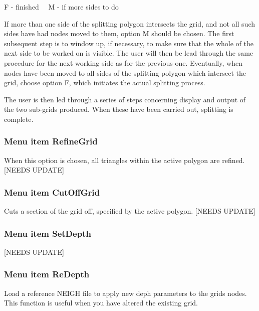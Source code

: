 \documentclass{article}
\begin{document}
F - finished \ \ M - if more sides to do

If more than one side of the splitting polygon intersects the grid, and not all such sides have had nodes moved to them, option M should be chosen. The first subsequent step is to window up, if necessary, to make sure that the whole of the next side to be worked on is visible. The user will then be lead through the same procedure for the next working side as for the previous one. Eventually, when nodes have been moved to all sides of the splitting polygon which intersect the grid, choose option F, which initiates the actual splitting process.

The user is then led through a series of steps concerning display and output of the two sub-grids produced. When these have been carried out, splitting is complete.

\subsubsection[Menu item RefineGrid]{Menu item RefineGrid}
When this option is chosen, all triangles within the active polygon are refined. [NEEDS UPDATE]

\subsubsection[Menu item CutOffGrid]{Menu item CutOffGrid}
Cuts a section of the grid off, specified by the active polygon. [NEEDS UPDATE]

\subsubsection[Menu item SetDepth]{Menu item SetDepth}
[NEEDS UPDATE]




\subsubsection[Menu item ReDepth]{Menu item ReDepth}
Load a reference NEIGH file to apply new deph parameters to the grids nodes. This function is useful when you have altered the existing grid. 
\end{document}
